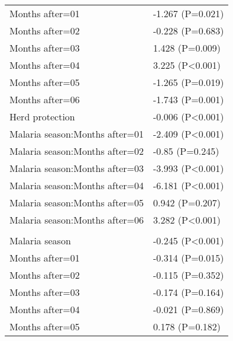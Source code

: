\documentclass[]{article}
\begin{document}
\begin{longtable}[t]{ll}
\hspace{1em}Months after=01 & -1.267 (P=0.021)\\
\hspace{1em}Months after=02 & -0.228 (P=0.683)\\
\hspace{1em}Months after=03 & 1.428 (P=0.009)\\
\hspace{1em}Months after=04 & 3.225 (P<0.001)\\
\hspace{1em}Months after=05 & -1.265 (P=0.019)\\
\hspace{1em}Months after=06 & -1.743 (P=0.001)\\
\hspace{1em}Herd protection & -0.006 (P<0.001)\\
\hspace{1em}Malaria season:Months after=01 & -2.409 (P<0.001)\\
\hspace{1em}Malaria season:Months after=02 & -0.85 (P=0.245)\\
\hspace{1em}Malaria season:Months after=03 & -3.993 (P<0.001)\\
\hspace{1em}Malaria season:Months after=04 & -6.181 (P<0.001)\\
\hspace{1em}Malaria season:Months after=05 & 0.942 (P=0.207)\\
\hspace{1em}Malaria season:Months after=06 & 3.282 (P<0.001)\\
\addlinespace[1.5em]
\multicolumn{2}{l}{\textbf{Temporary field worker}}\\
\hspace{1em}Malaria season & -0.245 (P<0.001)\\
\hspace{1em}Months after=01 & -0.314 (P=0.015)\\
\hspace{1em}Months after=02 & -0.115 (P=0.352)\\
\hspace{1em}Months after=03 & -0.174 (P=0.164)\\
\hspace{1em}Months after=04 & -0.021 (P=0.869)\\
\hspace{1em}Months after=05 & 0.178 (P=0.182)\\

\end{longtable}
\end{document}
